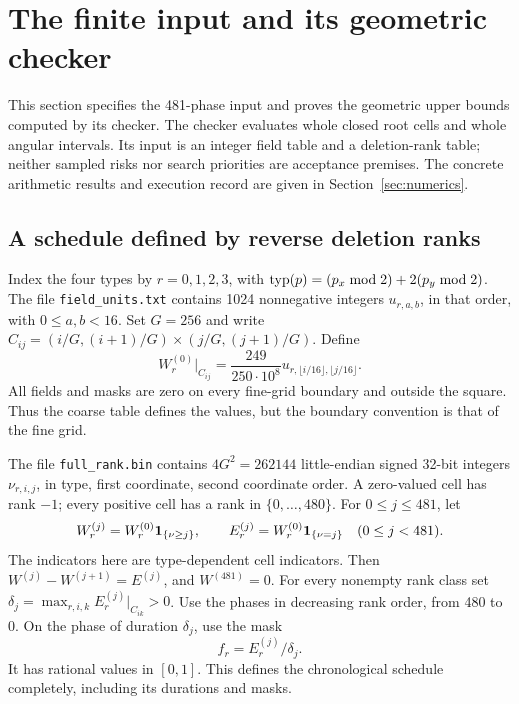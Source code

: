 \section{The finite input and its geometric checker}\label{sec:certificates}

This section specifies the 481-phase input and proves the geometric
upper bounds computed by its checker. The checker evaluates whole
closed root cells and whole angular intervals. Its input is an integer
field table and a deletion-rank table; neither sampled risks nor
search priorities are acceptance premises. The concrete arithmetic
results and execution record are given in Section~\ref{sec:numerics}.

\subsection{A schedule defined by reverse deletion ranks}\label{sec:rankinput}
Index the four types by \(r=0,1,2,3\), with
\(\operatorname{typ}(p)=(p_x\bmod2)+2(p_y\bmod2)\). The file
\texttt{field\_units.txt} contains 1024 nonnegative integers
\(u_{r,a,b}\), in that order, with \(0\le a,b<16\).
Set \(G=256\) and write
\(C_{ij}=(i/G,(i+1)/G)\times(j/G,(j+1)/G)\). Define
\begin{equation}\label{eq:rankfield}
 W_r^{(0)}\big|_{C_{ij}}
 =\frac{249}{250\cdot10^8}
       u_{r,\lfloor i/16\rfloor,\lfloor j/16\rfloor}.
\end{equation}
All fields and masks are zero on every fine-grid boundary and outside
the square. Thus the coarse table defines the values, but the boundary
convention is that of the fine grid.

The file \texttt{full\_rank.bin} contains \(4G^2=262144\)
little-endian signed 32-bit integers \(\nu_{r,i,j}\), in type, first
coordinate, second coordinate order. A zero-valued cell has rank
\(-1\); every positive cell has a rank in \(\{0,\ldots,480\}\).
For \(0\le j\le481\), let
\[
 W_r^{(j)}=W_r^{(0)}\mathbf 1_{\{\nu\ge j\}},
 \qquad E_r^{(j)}=W_r^{(0)}\mathbf 1_{\{\nu=j\}}
       \quad(0\le j<481).
\]
The indicators here are type-dependent cell indicators.
Then \(W^{(j)}-W^{(j+1)}=E^{(j)}\), and \(W^{(481)}=0\).
For every nonempty rank class set
\(\delta_j=\max_{r,i,k}E_r^{(j)}|_{C_{ik}}>0\).
Use the phases in decreasing rank order, from 480 to 0. On the phase
of duration \(\delta_j\), use the mask
\begin{equation}\label{eq:rankmask}
 f_r=E_r^{(j)}/\delta_j.
\end{equation}
It has rational values in \([0,1]\). This defines the chronological
schedule completely, including its durations and masks.

